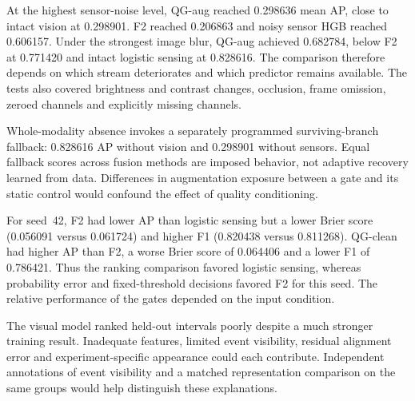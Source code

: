 At the highest sensor-noise level, QG-aug reached 0.298636 mean AP, close to intact
vision at 0.298901. F2 reached 0.206863 and noisy sensor HGB reached 0.606157. Under the
strongest image blur, QG-aug achieved 0.682784, below F2 at 0.771420 and intact logistic
sensing at 0.828616. The comparison therefore depends on which stream deteriorates and
which predictor remains available. The tests also covered brightness and contrast
changes, occlusion, frame omission, zeroed channels and explicitly missing channels.

Whole-modality absence invokes a separately programmed surviving-branch fallback:
0.828616 AP without vision and 0.298901 without sensors. Equal fallback scores across
fusion methods are imposed behavior, not adaptive recovery learned from data.
Differences in augmentation exposure between a gate and its static control would
confound the effect of quality conditioning.

For seed~42, F2 had lower AP than logistic sensing but a lower Brier score (0.056091
versus 0.061724) and higher F1 (0.820438 versus 0.811268). QG-clean had higher AP than
F2, a worse Brier score of 0.064406 and a lower F1 of 0.786421. Thus the ranking
comparison favored logistic sensing, whereas probability error and fixed-threshold
decisions favored F2 for this seed. The relative performance of the gates depended on
the input condition.

The visual model ranked held-out intervals poorly despite a much stronger training
result. Inadequate features, limited event visibility, residual alignment error and
experiment-specific appearance could each contribute. Independent annotations of event
visibility and a matched representation comparison on the same groups would help
distinguish these explanations.
